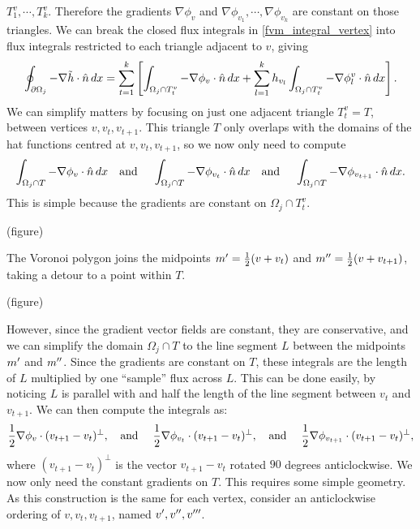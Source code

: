 $T^v_1,\cdots,T^v_k$. Therefore the gradients $\nabla\phi_v$ and $\nabla\phi_{v_1},\cdots,\nabla\phi_{v_k}$ are constant
on those triangles. We can break the closed flux integrals in \eqref{fvm_integral_vertex} into flux integrals restricted to each triangle adjacent to $v$, giving
\begin{equation}\label{fvm_integral_vertex_triangles}
    \oint_{{\partial\Omega}_j} -\nabla \tilde{h}\cdot\hat{n}\,dx = \sum_{t=1}^k\left[\int_{\Omega_j \cap T^v_t}-\nabla\phi_v\cdot\hat{n}\,dx + \sum_{l=1}^{k}h_{v_l}\int_{\Omega_j \cap T^v_t}-\nabla\phi^v_l\cdot\hat{n}\,dx\right].
\end{equation}
We can simplify matters by focusing on just one adjacent triangle $T^v_t = T$, between vertices
$v,v_t,v_{t+1}$. This triangle $T$ only overlaps with the domains of the hat functions centred at $v,v_t,v_{t+1}$, so we
now only need to compute
$$
\int_{\Omega_j \cap T} -\nabla\phi_v\cdot\hat{n}\,dx \text{\quad and \quad} 
\int_{\Omega_j \cap T} -\nabla\phi_{v_t}\cdot\hat{n}\,dx \text{\quad and \quad} 
\int_{\Omega_j \cap T} -\nabla\phi_{v_{t+1}}\cdot\hat{n}\,dx.
$$
This is simple because the gradients are constant on $\Omega_j \cap T_t^v$.

\vskip 0.2in
(figure)
\vskip 0.2in

The Voronoi polygon joins the midpoints $m^{\prime} = \frac{1}{2}(v + v_t)$ and $m^{\prime\prime} = \frac{1}{2}(v + v_{t+1})$, taking a detour to a point within $T$.

\vskip 0.2in
(figure)
\vskip 0.2in

However, since the gradient vector fields are constant, they are conservative, and we can simplify the domain $\Omega_j \cap T$ to the line segment $L$ between
the midpoints $m^{\prime}$ and $m^{\prime\prime}$. Since the gradients are constant on $T$, these integrals are the length of $L$ multiplied by one ``sample'' flux across $L$.
This can be done easily, by noticing $L$ is parallel with and half the length of the line segment between $v_t$ and $v_{t+1}$.
We can then compute the integrals as:
\begin{equation}\label{fvm_integrals_closed}
    \frac{1}{2}\nabla\phi_v\cdot(v_{t+1} - v_t)^\perp,\text{\quad and \quad}
    \frac{1}{2}\nabla\phi_{v_t}\cdot(v_{t+1} - v_t)^\perp,\text{\quad and \quad}
    \frac{1}{2}\nabla\phi_{v_{t+1}}\cdot(v_{t+1} - v_t)^\perp,
\end{equation}
where $(v_{t+1} - v_t)^\perp$ is the vector $v_{t+1} - v_t$ rotated $90$ degrees anticlockwise.
We now only need the constant gradients on $T$. This requires some simple geometry. As this construction is the same for each vertex, consider an anticlockwise ordering of $v,v_t,v_{t+1}$, named $v^{\prime},v^{\prime\prime},v^{\prime\prime\prime}$.

